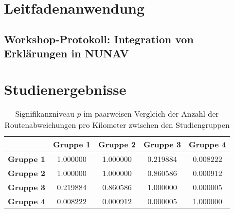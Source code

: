 \appendix

\chapter{Leitfadenanwendung}

\section{Workshop-Protokoll: Integration von Erklärungen in NUNAV}
\label{sec:appendix_workshop_protocol}

\chapter{Studienergebnisse}
\label{sec:appendix_study_results}

\begin{table}
    \begin{center}
        \begin{tabular}{|c|c|c|c|c|}
            \hline
            & \textbf{Gruppe 1} & \textbf{Gruppe 2} & \textbf{Gruppe 3} & \textbf{Gruppe 4} \\ \hline
            \textbf{Gruppe 1}   & 1.000000 & 1.000000 & 0.219884 & 0.008222 \\ \hline
            \textbf{Gruppe 2}   & 1.000000 & 1.000000 & 0.860586 & 0.000912 \\ \hline
            \textbf{Gruppe 3}   & 0.219884 & 0.860586 & 1.000000 & 0.000005 \\ \hline
            \textbf{Gruppe 4}   & 0.008222 & 0.000912 & 0.000005 & 1.000000 \\ \hline
        \end{tabular}
    \end{center}
    
    \caption{Signifikanzniveau $ p $ im paarweisen Vergleich der Anzahl der Routenabweichungen pro Kilometer zwischen den Studiengruppen }
    \label{tab:study_offroute_significance_results}
\end{table}